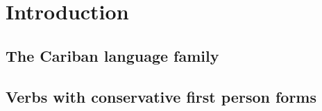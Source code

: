 \section{Introduction}
\label{sec:intro}

\subsection{The Cariban language family}

%


\subsection{Verbs with conservative first person forms}


